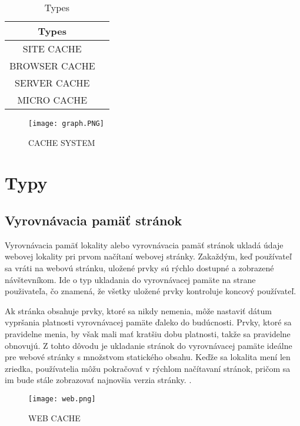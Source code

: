 \documentclass[10pt,oneside,slovak,a4paper]{article}
\begin{document}
\begin{table}[H]
\centering
\begin{tabular}{|c|c|}
\hline
    \textbf{Types} \\
     \hline
     SITE CACHE  \\
     \hline
     BROWSER CACHE  \\
     \hline
     SERVER CACHE  \\
     \hline
     MICRO CACHE  \\
    \hline
\end{tabular}
\caption{Types\cite{MAN}}
\label{fig:tab1}
\end{table}


\begin{figure}[H]
\centering
\texttt{[image: graph.PNG]}
\caption{CACHE SYSTEM\cite{IEEE}}
\label{fig:diag2}
\end{figure}

\section{Typy}

\subsection{Vyrovnávacia pamäť stránok}
\quad
Vyrovnávacia pamäť lokality alebo vyrovnávacia pamäť stránok ukladá údaje webovej lokality pri prvom načítaní webovej stránky. Zakaždým, keď používateľ
sa vráti na  webovú stránku, uložené prvky sú rýchlo dostupné a zobrazené návštevníkom. Ide o typ ukladania do vyrovnávacej pamäte na strane použivateľa, čo znamená, že všetky uložené prvky kontroluje koncový používateľ.

Ak stránka obsahuje prvky, ktoré sa nikdy nemenia, môže nastaviť dátum vypršania platnosti vyrovnávacej pamäte ďaleko do budúcnosti. Prvky, ktoré sa pravidelne menia, by však mali mať kratšiu dobu platnosti, takže sa pravidelne obnovujú. Z tohto dôvodu je ukladanie stránok do vyrovnávacej pamäte ideálne pre webové stránky s množstvom statického obsahu. Keďže sa  lokalita mení len zriedka, používatelia môžu pokračovať v rýchlom načítavaní  stránok, pričom sa im bude stále zobrazovať najnovšia verzia stránky. .
\begin{figure}[H]
\centering
\texttt{[image: web.png]}
\caption{WEB CACHE\cite{CHECK}}
\label{fig:diag}
\end{figure}
\end{document}
